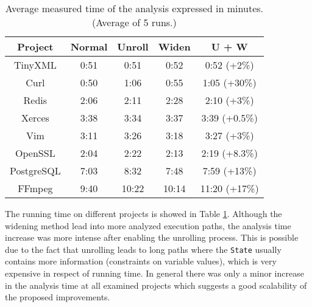 \begin{table}[!htb]
	\centering
\begin{tabular}{ |c||c|c|c|c| } 
	\hline
	Project & Normal & Unroll & Widen & U + W \\
	\hline \hline
	TinyXML & 0:51 & 0:51 & 0:52 & 0:52 (+2\%) \\ 
	\hline
	Curl & 0:50 & 1:06 & 0:55 & 1:05 (+30\%) \\ 
	\hline
	Redis & 2:06 & 2:11 & 2:28 & 2:10 (+3\%) \\ 
	\hline
	Xerces & 3:38 & 3:34 & 3:37 & 3:39 (+0.5\%) \\ 
	\hline
	Vim & 3:11 & 3:26 & 3:18 & 3:27 (+3\%) \\
	\hline
	OpenSSL & 2:04 & 2:22 & 2:13 & 2:19 (+8.3\%) \\
	\hline
	PostgreSQL & 7:03 & 8:32 & 7:48 & 7:59 (+13\%) \\
	\hline
	FFmpeg & 9:40 & 10:22 & 10:14 & 11:20 (+17\%) \\
	\hline
\end{tabular}
\caption{Average measured time of the analysis expressed in minutes. 
(Average of 5 runs.)}\label{tab:time}
\end{table} 
The running time on different projects is showed in Table \ref{tab:time}.
Although the widening method lead into more analyzed execution paths, the analysis time increase was more intense after enabling the unrolling process. This is possible due to the fact that unrolling leads to long paths where the \texttt{State} usually contains more information (constraints on variable values), which is very expensive in respect of running time. 
In general there was only a minor increase in the analysis time at all examined projects which suggests a good scalability of the proposed improvements.
